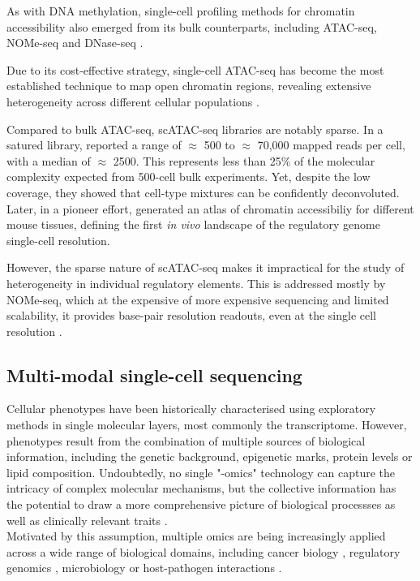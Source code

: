 As with DNA methylation, single-cell profiling methods for chromatin accessibility also emerged from its bulk counterparts, including ATAC-seq\cite{Buenrostro2015a}, NOMe-seq \cite{Pott2016} and DNase-seq \cite{Jin2015}.

Due to its cost-effective strategy, single-cell ATAC-seq has become the most established technique to map open chromatin regions, revealing extensive heterogeneity across different cellular populations \cite{Cusanovich2015,Cao2018,Chen2018}. 

Compared to bulk ATAC-seq, scATAC-seq libraries are notably sparse. In a satured library, \cite{Cusanovich2015} reported a range of $\approx$ 500 to $\approx$ 70,000 mapped reads per cell, with a median of $\approx$ 2500. This represents less than 25\% of the molecular complexity expected from 500-cell bulk experiments. Yet, despite the low coverage, they showed that cell-type mixtures can be confidently deconvoluted. Later, in a pioneer effort, \cite{Cusanovich2018b} generated an atlas of chromatin accessibiliy for different mouse tissues, defining the first \textit{in vivo} landscape of the regulatory genome single-cell resolution.

However, the sparse nature of scATAC-seq makes it impractical for the study of heterogeneity in individual regulatory elements. This is addressed mostly by NOMe-seq, which at the expensive of more expensive sequencing and limited scalability, it provides base-pair resolution readouts, even at the single cell resolution \cite{Pott2016}.


\subsection{Multi-modal single-cell sequencing}
Cellular phenotypes have been historically characterised using exploratory methods in single molecular layers, most commonly the transcriptome. However, phenotypes result from the combination of multiple sources of biological information, including the genetic background, epigenetic marks, protein levels or lipid composition. Undoubtedly, no single "-omics" technology can capture the intricacy of complex molecular mechanisms, but the collective information has the potential to draw a more comprehensive picture of biological processses as well as clinically relevant traits \cite{Hasin2017,Ritchie2015}.\\
Motivated by this assumption, multiple omics are being increasingly applied across a wide range of biological domains, including cancer biology \cite{Akavia2010,Gerstung2015}, regulatory genomics \cite{Chen2016}, microbiology \cite{Kim2016} or host-pathogen interactions \cite{Soderholm2016}.


